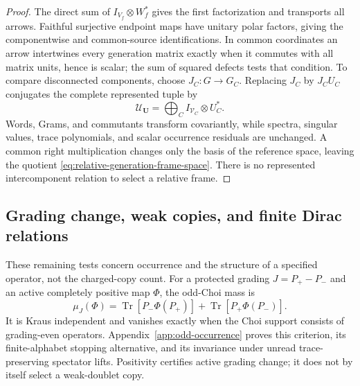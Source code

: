 \documentclass[11pt]{article}
\numberwithin{equation}{section}
\theoremstyle{definition}
\theoremstyle{remark}
\newcommand{\Tr}{\operatorname{Tr}}
\begin{document}
\begin{proof}
The direct sum of $I_{V_f}\otimes W_f^*$ gives the first factorization and
transports all arrows.  Faithful surjective endpoint maps have unitary polar
factors, giving the componentwise and common-source identifications.
In common coordinates an arrow intertwines every generation matrix exactly
when it commutes with all matrix units, hence is scalar; the sum of squared
defects tests that condition.  To compare disconnected components, choose
$J_C:G\to G_C$.  Replacing $J_C$ by $J_CU_C$ conjugates the complete
represented tuple by
\begin{equation}
 \mathcal U_{\bm U}=\bigoplus_C I_{\mathcal V_C}\otimes U_C^*.
 \label{eq:relative-generation-coordinate-change}
\end{equation}
Words, Grams, and commutants transform covariantly, while spectra, singular
values, trace polynomials, and scalar occurrence residuals are unchanged.
A common right multiplication changes only the basis of the reference
space, leaving the quotient \eqref{eq:relative-generation-frame-space}.
There is no represented intercomponent relation to select a relative frame.
\end{proof}


\subsection{Grading change, weak copies, and finite Dirac relations}

These remaining tests concern occurrence and the structure of a specified
operator, not the charged-copy count.  For a protected grading
$J=P_+-P_-$ and an active completely positive map $\Phi$, the odd-Choi mass is
\[
 \mu_J(\Phi)=\Tr[P_-\Phi(P_+)]+\Tr[P_+\Phi(P_-)].
\]
It is Kraus independent and vanishes exactly when the Choi support consists
of grading-even operators.  Appendix~\ref{app:odd-occurrence} proves this
criterion, its finite-alphabet stopping alternative, and its invariance
under unread trace-preserving spectator lifts.  Positivity certifies active
grading change; it does not by itself select a weak-doublet copy.
\end{document}
